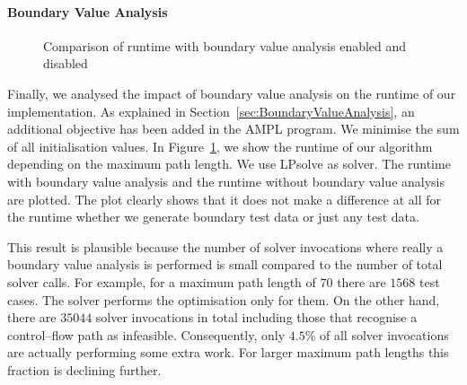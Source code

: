 \documentclass[runningheads,a4paper]{llncs}%
\begin{document}
\paragraph{Boundary Value Analysis}
\label{sec:caseStudyBoundaryValues}
\begin{figure}
\begin{center}
%
\end{center}%
\caption{Comparison of runtime with boundary value analysis enabled and disabled}%
\label{fig:RuntimeBoundaryValue}%
\end{figure}%
Finally, we analysed the impact of boundary value analysis on the runtime of our
implementation. As explained in Section~\ref{sec:BoundaryValueAnalysis}, an
additional objective has been added in the AMPL program. We minimise the sum of
all initialisation values. In Figure~\ref{fig:RuntimeBoundaryValue}, we show the
runtime of our algorithm depending on the maximum path length. We use LPsolve as
solver. The runtime with boundary value analysis and the runtime without
boundary value analysis are plotted. The plot clearly shows that it does not
make a difference at all for the runtime whether we generate boundary test data
or just any test data.

This result is plausible because the number of solver invocations where really a
boundary value analysis is performed is small compared to the number of total
solver calls. For example, for a maximum path length of $70$ there are $1568$
test cases. The solver performs the optimisation only for them. On the other
hand, there are $35044$ solver invocations in total including those that
recognise a control--flow path as infeasible. Consequently, only $4.5\%$ of all
solver invocations are actually performing some extra work. For larger maximum
path lengths this fraction is declining further.
\end{document}
